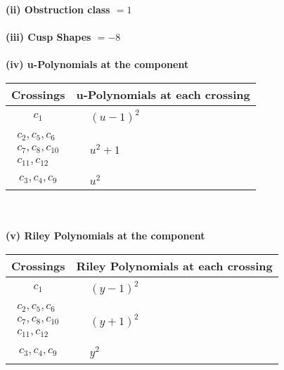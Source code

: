 \documentclass[1p]{elsarticle_modified}
\theoremstyle{definition}
\begin{document}
\flushleft \textbf{(ii) Obstruction class $= 1$}\\~\\
\flushleft \textbf{(iii) Cusp Shapes $= -8$}\\~\\
\newpage\renewcommand{\arraystretch}{1}
\flushleft \textbf{(iv) u-Polynomials at the component}\newline \\
\begin{tabular}{m{50pt}|m{274pt}}
Crossings & \hspace{64pt}u-Polynomials at each crossing \\
\hline $$\begin{aligned}c_{1}\end{aligned}$$&$\begin{aligned}
&(u-1)^2
\end{aligned}$\\
\hline $$\begin{aligned}c_{2},c_{5},c_{6}\\c_{7},c_{8},c_{10}\\c_{11},c_{12}\end{aligned}$$&$\begin{aligned}
&u^2+1
\end{aligned}$\\
\hline $$\begin{aligned}c_{3},c_{4},c_{9}\end{aligned}$$&$\begin{aligned}
&u^2
\end{aligned}$\\
\hline
\end{tabular}\\~\\
\newpage\renewcommand{\arraystretch}{1}
\flushleft \textbf{(v) Riley Polynomials at the component}\newline \\
\begin{tabular}{m{50pt}|m{274pt}}
Crossings & \hspace{64pt}Riley Polynomials at each crossing \\
\hline $$\begin{aligned}c_{1}\end{aligned}$$&$\begin{aligned}
&(y-1)^2
\end{aligned}$\\
\hline $$\begin{aligned}c_{2},c_{5},c_{6}\\c_{7},c_{8},c_{10}\\c_{11},c_{12}\end{aligned}$$&$\begin{aligned}
&(y+1)^2
\end{aligned}$\\
\hline $$\begin{aligned}c_{3},c_{4},c_{9}\end{aligned}$$&$\begin{aligned}
&y^2
\end{aligned}$\\
\hline
\end{tabular}\\~\\
\end{document}
